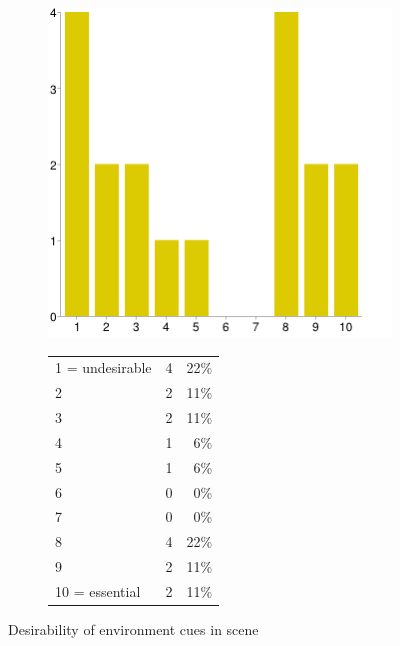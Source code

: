 \documentclass[MSc,paper=a4,pagesize=auto]{icldt}
\begin{document}
\begin{figure}[htbp!]
\centering
\begin{subfigure}{0.4\textwidth}
    \centering
    \includegraphics[width=1\linewidth]{resources/16-want_cues}
\end{subfigure}%
\centering
\begin{subfigure}{0.5\textwidth}
    \centering
   	\begin{tabular}{ l c r }
1 = undesirable&4&22\% \\
2&2&11\% \\
3&2&11\% \\
4&1&6\% \\
5&1&6\% \\
6&0&0\% \\
7&0&0\% \\
8&4&22\% \\
9&2&11\% \\
10 = essential&2&11\% \\
\end{tabular}
\end{subfigure} 
    \caption{Desirability of environment cues in scene}
    \label{fig:16-want_cues}
\end{figure}

\end{document}
